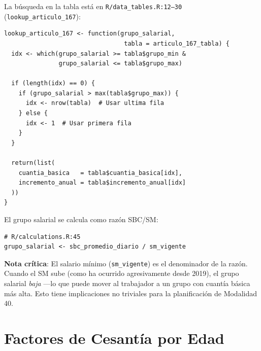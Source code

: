 \documentclass[11pt,a4paper]{report}
\begin{document}
\begin{tcolorbox}[colback=orange!5!white, colframe=orange!75!black, title=\textbf{Aplicaci\'on en C\'odigo}]
La b\'usqueda en la tabla est\'a en \texttt{R/data\_tables.R:12--30} (\texttt{lookup\_articulo\_167}):

\begin{lstlisting}
lookup_articulo_167 <- function(grupo_salarial,
                                 tabla = articulo_167_tabla) {
  idx <- which(grupo_salarial >= tabla$grupo_min &
               grupo_salarial <= tabla$grupo_max)

  if (length(idx) == 0) {
    if (grupo_salarial > max(tabla$grupo_max)) {
      idx <- nrow(tabla)  # Usar ultima fila
    } else {
      idx <- 1  # Usar primera fila
    }
  }

  return(list(
    cuantia_basica   = tabla$cuantia_basica[idx],
    incremento_anual = tabla$incremento_anual[idx]
  ))
}
\end{lstlisting}

El grupo salarial se calcula como raz\'on SBC/SM:
\begin{lstlisting}
# R/calculations.R:45
grupo_salarial <- sbc_promedio_diario / sm_vigente
\end{lstlisting}

\textbf{Nota cr\'itica}: El salario m\'inimo (\texttt{sm\_vigente}) es el denominador de la raz\'on. Cuando el SM sube (como ha ocurrido agresivamente desde 2019), el grupo salarial \emph{baja} ---lo que puede mover al trabajador a un grupo con cuant\'ia b\'asica m\'as alta. Esto tiene implicaciones no triviales para la planificaci\'on de Modalidad 40.
\end{tcolorbox}

\section{Factores de Cesant\'ia por Edad}
\end{document}
